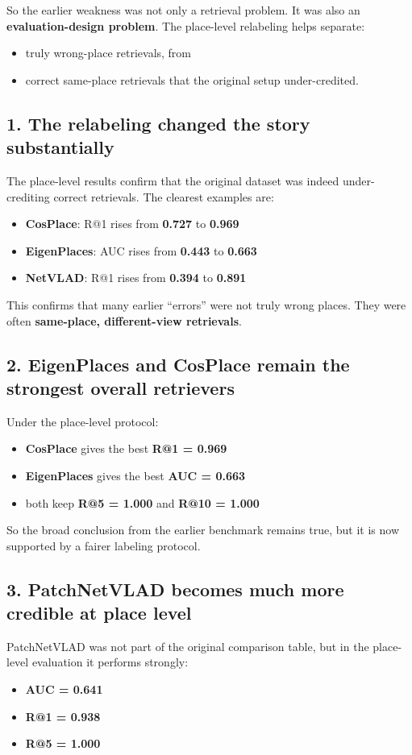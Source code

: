 \documentclass[11pt]{article}
\begin{document}
So the earlier weakness was not only a retrieval problem. It was also an \textbf{evaluation-design problem}. The place-level relabeling helps separate:
\begin{itemize}[leftmargin=*]
  \item truly wrong-place retrievals, from
  \item correct same-place retrievals that the original setup under-credited.
\end{itemize}

\subsection*{1. The relabeling changed the story substantially}
The place-level results confirm that the original dataset was indeed under-crediting correct retrievals. The clearest examples are:
\begin{itemize}[leftmargin=*]
  \item \textbf{CosPlace}: R@1 rises from \textbf{0.727} to \textbf{0.969}
  \item \textbf{EigenPlaces}: AUC rises from \textbf{0.443} to \textbf{0.663}
  \item \textbf{NetVLAD}: R@1 rises from \textbf{0.394} to \textbf{0.891}
\end{itemize}

This confirms that many earlier ``errors'' were not truly wrong places. They were often \textbf{same-place, different-view retrievals}.

\subsection*{2. EigenPlaces and CosPlace remain the strongest overall retrievers}
Under the place-level protocol:
\begin{itemize}[leftmargin=*]
  \item \textbf{CosPlace} gives the best \textbf{R@1 = 0.969}
  \item \textbf{EigenPlaces} gives the best \textbf{AUC = 0.663}
  \item both keep \textbf{R@5 = 1.000} and \textbf{R@10 = 1.000}
\end{itemize}

So the broad conclusion from the earlier benchmark remains true, but it is now supported by a fairer labeling protocol.

\subsection*{3. PatchNetVLAD becomes much more credible at place level}
PatchNetVLAD was not part of the original comparison table, but in the place-level evaluation it performs strongly:
\begin{itemize}[leftmargin=*]
  \item \textbf{AUC = 0.641}
  \item \textbf{R@1 = 0.938}
  \item \textbf{R@5 = 1.000}
\end{itemize}
\end{document}
